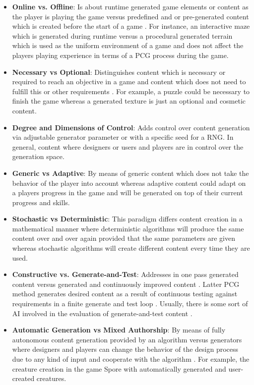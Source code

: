 \documentclass[MGS,Master,english]{twbook}%
\begin{document}
\begin{itemize}
	\item \textbf{Online vs. Offline}: Is about runtime generated game elements or content as the player is playing the game versus predefined and or pre-generated content which is created before the start of a game \cite{pcg::book}. For instance, an interactive maze which is generated during runtime versus a procedural generated terrain which is used as the uniform environment of a game and does not affect the players playing experience in terms of a PCG process during the game.
	\item \textbf{Necessary vs Optional}: Distinguishes content which is necessary or required to reach an objective in a game and content which does not need to fulfill this or other requirements \cite{pcg::book}. For example, a puzzle could be necessary to finish the game whereas a generated texture is just an optional and cosmetic content.
	\item \textbf{Degree and Dimensions of Control}: Adds control over content generation via adjustable generator parameter or with a specific seed for a \ac{RNG}. In general, content where designers or users and players are in control over the generation space. \cite{pcg::book}
	\item \textbf{Generic vs Adaptive}: By means of generic content which does not take the behavior of the player into account whereas adaptive content could adapt on a players progress in the game and will be generated on top of their current progress and skills. \cite{pcg::book}
	\item \textbf{Stochastic vs Deterministic}: This paradigm differs content creation in a mathematical manner where deterministic algorithms will produce the same content over and over again provided that the same parameters are given whereas stochastic algorithms will create different content every time they are used. \cite{pcg::book}
	\item \textbf{Constructive vs. Generate-and-Test}: Addresses in one pass generated content versus generated and continuously improved content \cite{pcg::book}. Latter PCG method generates desired content as a result of continuous testing against requirements in a finite generate and test loop \cite{pcg::book}. Usually, there is some sort of AI involved in the evaluation of generate-and-test content \cite{pcg::book}. 
	\item \textbf{Automatic Generation vs Mixed Authorship}: By means of fully autonomous content generation provided by an algorithm versus generators where designers and players can change the behavior of the design process due to any kind of input and cooperate with the algorithm \cite{pcg::book}. For example, the creature creation in the game Spore \cite{game::spore} with automatically generated and user-created creatures.
\end{itemize}
\end{document}
